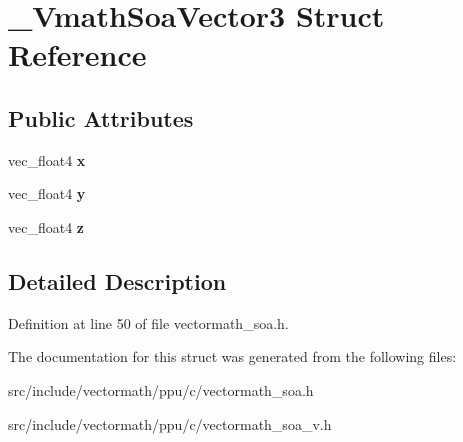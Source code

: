 \hypertarget{struct__VmathSoaVector3}{\section{\-\_\-\-Vmath\-Soa\-Vector3 Struct Reference}
\label{struct__VmathSoaVector3}
}
\subsection*{Public Attributes}
\begin{DoxyCompactItemize}
\item 
\hypertarget{struct__VmathSoaVector3_aa6ccd8f99a2972a3b313029546d3c234}{vec\-\_\-float4 {\bfseries x}}\label{struct__VmathSoaVector3_aa6ccd8f99a2972a3b313029546d3c234}

\item 
\hypertarget{struct__VmathSoaVector3_a6dd067a310742a0927056ccd34d7b611}{vec\-\_\-float4 {\bfseries y}}\label{struct__VmathSoaVector3_a6dd067a310742a0927056ccd34d7b611}

\item 
\hypertarget{struct__VmathSoaVector3_a734a2ed58c941b4ad66877a5f516a1ab}{vec\-\_\-float4 {\bfseries z}}\label{struct__VmathSoaVector3_a734a2ed58c941b4ad66877a5f516a1ab}

\end{DoxyCompactItemize}


\subsection{Detailed Description}


Definition at line 50 of file vectormath\-\_\-soa.\-h.



The documentation for this struct was generated from the following files\-:\begin{DoxyCompactItemize}
\item 
src/include/vectormath/ppu/c/vectormath\-\_\-soa.\-h\item 
src/include/vectormath/ppu/c/vectormath\-\_\-soa\-\_\-v.\-h\end{DoxyCompactItemize}
